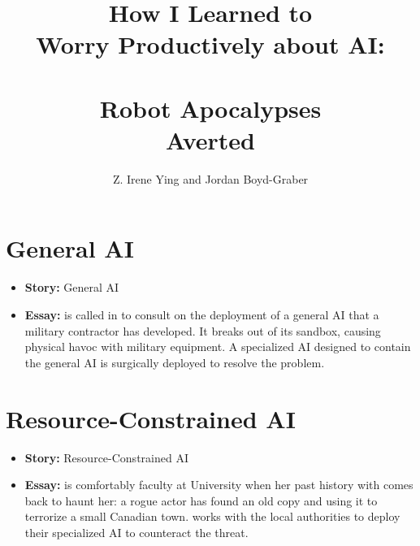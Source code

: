 \documentclass[bfivepaper,twosided,justified,nobib]{tufte-book}
\title{How I Learned to \\ Worry Productively about AI: \\  \\ Robot Apocalypses \\ Averted}
\author{Z. Irene Ying and Jordan Boyd-Graber}
\begin{document}

\frontmatter








%

\newcommand{\outline}[3]{\chapter{#1}
  \begin{itemize}
  \item {\bf Story:} #1
  \item {\bf Essay:} #2
  \end{itemize}
}

\outline{General AI}{\lastname{} is called in to consult on the
  deployment of a general AI that a military contractor has developed.
  It breaks out of its sandbox, causing physical havoc with military
  equipment.  A specialized AI designed to contain the general AI is
  surgically deployed to resolve the problem.}{This chapter explores
  the distinction between general and specialized
  AI---\specializedai{}---and how the pressures and history of a
  general AI cause them to be vulnerable to specialized algorithms and
  methods.}

\outline{Resource-Constrained AI}{\lastname{} is comfortably faculty
  at University when her past history with \specializedai{} comes back
  to haunt her: a rogue actor has found an old copy and using it to
  terrorize a small Canadian town.  \lastname{} works with the local
  authorities to deploy their specialized AI to counteract the
  threat.}{This chapter explores how governments' role as a protector
  of populations and evolves in a world with ubiquitous and powerful
  artifcial intelligence.  Although in some ways AI is democratizing,
  it is still connected to access to real-world resources (material,
  energy, physical space), and governments and multinational
  corporations will have the most powerful and capable AI agents.
  Just as we trust governments with technology that can end the world
  (nuclear weapons), we must trust the government to responsibly
  harness the power of artificial intelligence.}
\end{document}
